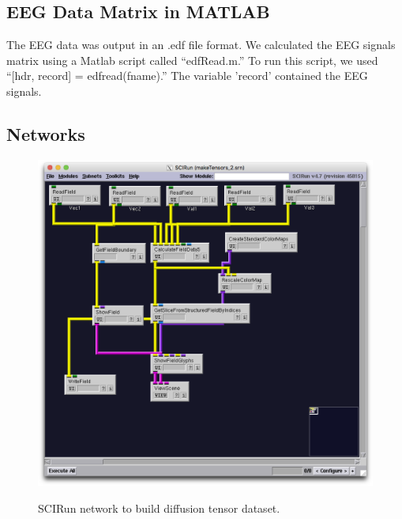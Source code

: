 \subsection{EEG Data Matrix in MATLAB}
\label{ref:eegmatlab}

The EEG data was output in an .edf file format. We calculated the EEG signals matrix using a Matlab script called ``edfRead.m.'' \cite{ref:edfread} To run this script, we used ``[hdr, record] = edfread(fname).'' The variable 'record' contained the EEG signals. 

\subsection{Networks}
\label{sec:networks}

\begin{figure}[p]
\begin{center}
\includegraphics[width=\textwidth]{Figures/make_DTI.png}\\
\caption{SCIRun network to build diffusion tensor dataset.}
\label{fig:maketensornet}
\end{center}
\end{figure}


